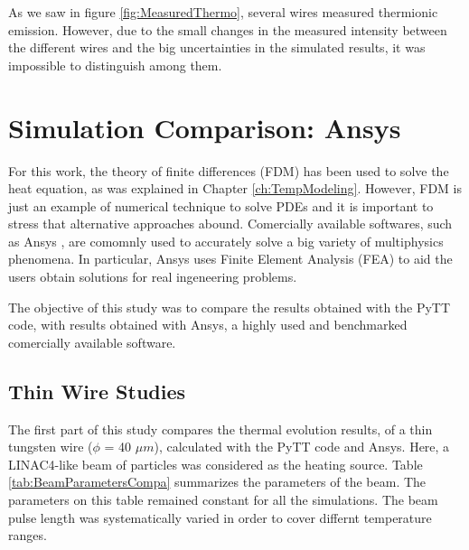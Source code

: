 As we saw in figure \ref{fig:MeasuredThermo}, several wires measured thermionic emission. However, due to the small changes in the measured intensity between the different wires and the big uncertainties in the simulated results, it was impossible to distinguish among them. 

\section{Simulation Comparison: Ansys}

For this work, the theory of finite differences (FDM) has been used to solve the heat equation, as was explained in Chapter \ref{ch:TempModeling}. However, FDM is just an example of numerical technique to solve PDEs and it is important to stress that alternative approaches abound. Comercially available softwares, such as Ansys \parencite[][]{ref:Ansys}, are comomnly used to accurately solve a big variety of multiphysics phenomena. In particular, Ansys uses Finite Element Analysis (FEA) \parencite[][]{ref:NumericalMethodBook} to aid the users obtain solutions for real ingeneering problems. 

The objective of this study was to compare the results obtained with the PyTT code, with results obtained with Ansys, a highly used and benchmarked comercially available software. 

\subsection{Thin Wire Studies}

The first part of this study compares the thermal evolution results, of a thin tungsten wire ($\phi$ = 40 $\mu m$), calculated with the PyTT code and Ansys. Here, a LINAC4-like beam of particles was considered as the heating source. Table \ref{tab:BeamParametersCompa} summarizes the parameters of the beam. The parameters on this table remained constant for all the simulations. The beam pulse length was systematically varied in order to cover differnt temperature ranges. 

